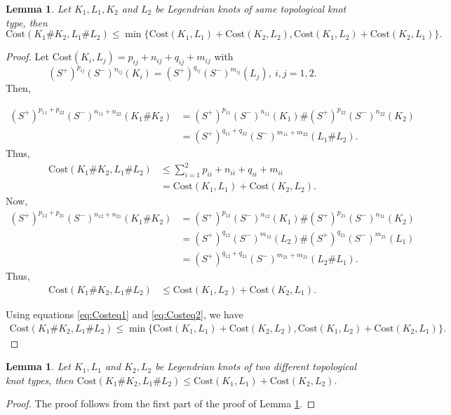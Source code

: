 \documentclass[11pt]{amsart}
\numberwithin{equation}{section}
\theoremstyle{plain}
\newtheorem{Lemma}[equation]{Lemma}
\theoremstyle{definition}
\theoremstyle{remark} \newtheorem{remark}[equation]{Remark}
\theoremstyle{remark} \newtheorem{observation}[equation]{Observation}
\newcommand{\Cost}{\text{Cost}}
\begin{document}
\begin{Lemma}\label{CostL18}
    Let $K_1,L_1, K_2$ and $L_2$ be Legendrian knots of same topological knot type, then $$\Cost(K_1\#K_2,L_1\#L_2)\leq \min\{\Cost(K_1,L_1)+\Cost(K_2,L_2),\Cost(K_1,L_2)+\Cost(K_2,L_1)\}.$$
\end{Lemma}
\begin{proof}
 Let $\Cost(K_i,L_j)=p_{ij}+n_{ij}+q_{ij}+m_{ij}$ with $$(S^+)^{p_{ij}}(S^-)^{n_{ij}}(K_i)=(S^+)^{q_{ij}}(S^-)^{m_{ij}}(L_j), \: i,j=1,2.$$ Then, 

    \begin{align}
        \nonumber (S^+)^{p_{11}+p_{22}}(S^-)^{n_{11}+n_{22}}(K_1\#K_2)&=(S^+)^{p_{11}}(S^-)^{n_{11}}(K_1)\#(S^+)^{p_{22}}(S^-)^{n_{22}}(K_2)\\
       \nonumber &=(S^+)^{q_{11}+q_{22}}(S^-)^{m_{11}+m_{22}}(L_1\#L_2).
        \end{align}
        Thus,
        \begin{align}
        \nonumber \Cost(K_1\#K_2,L_1\#L_2)&\leq \sum_{i=1}^2p_{ii}+n_{ii}+q_{ii}+m_{ii}\\
        &=\Cost(K_1,L_1)+\Cost(K_2,L_2).\label{eq:Costeq1}
    \end{align}
    Now,
     \begin{align}
       \nonumber (S^+)^{p_{12}+p_{21}}(S^-)^{n_{12}+n_{21}}(K_1\#K_2)&=(S^+)^{p_{12}}(S^-)^{n_{12}}(K_1)\#(S^+)^{p_{21}}(S^-)^{n_{21}}(K_2)\\
       \nonumber &=(S^+)^{q_{12}}(S^-)^{m_{12}}(L_2)\#(S^+)^{q_{21}}(S^-)^{m_{21}}(L_1)\\
       \nonumber &=(S^+)^{q_{12}+q_{21}}(S^-)^{m_{21}+m_{21}}(L_2\#L_1).
       \end{align}
       Thus,
       \begin{align}
        \Cost(K_1\#K_2,L_1\#L_2)&\leq \Cost(K_1,L_2)+\Cost(K_2,L_1).\label{eq:Costeq2}
    \end{align}

   Using equations \ref{eq:Costeq1} and \ref{eq:Costeq2}, we have 
   \begin{align*}
     \Cost(K_1\#K_2,L_1\#L_2)  \leq \min\{\Cost(K_1,L_1)+\Cost(K_2,L_2),\Cost(K_1,L_2)+\Cost(K_2,L_1)\}.
   \end{align*}
   
    \end{proof}

\begin{Lemma}\label{CostL19}
    Let $K_1,L_1$ and $K_2,L_2$ be Legendrian knots of two different topological knot types, then $\Cost(K_1\#K_2,L_1\#L_2)\leq \Cost(K_1,L_1)+\Cost(K_2,L_2)$.
\end{Lemma}
\begin{proof}
   The proof follows from the first part of the proof of Lemma \ref{CostL18}.
\end{proof}
\end{document}
